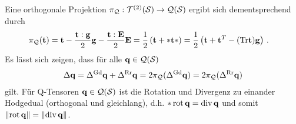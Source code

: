 \documentclass[a4paper,11pt]{scrartcl}
\newcommand{\qspace}{\mathcal{Q}(\surf)}
\newcommand{\qs}{\mathcal{Q}}
\newcommand{\tspace}{\mathcal{T}^{(2)}(\surf)}
\newcommand{\Tr}{\text{Tr}}
\newcommand{\lGd}{\Delta^{\text{Gd}}}
\newcommand{\lRr}{\Delta^{\text{Rr}}}
\begin{document}
Eine orthogonale Projektion \( \pi_{\qs}:\tspace\rightarrow\qspace \) ergibt sich dementsprechend durch
\begin{align}
  \pi_{\qs}(\tb) &= \tb - \frac{\tb:\gb}{2}\gb - \frac{\tb:\Eb}{2}\Eb
                  = \frac{1}{2}\left( \tb + *\tb* \right)
                  = \frac{1}{2}\left( \tb + \tb^{T} - (\Tr\tb)\gb \right) \formPeriod
\end{align}
Es lässt sich zeigen, dass für alle \( \qb\in\qspace \)
\begin{align}
  \Delta\qb = \lGd\qb + \lRr\qb = 2\pi_{\qs}(\lGd\qb) = 2\pi_{\qs}(\lRr\qb)
\end{align}
gilt.
Für Q-Tensoren \( \qb\in\qspace \) ist die Rotation und Divergenz zu einander Hodgedual (orthogonal und gleichlang), d.h.
\( *\operatorname{rot}\mathbf{q} = \operatorname{div}\mathbf{q} \) und somit \( \left\| \operatorname{rot}\mathbf{q} \right\| = \left\| \operatorname{div}\mathbf{q} \right\| \).
\end{document}
